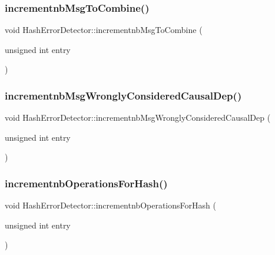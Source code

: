 \subsubsection{\texorpdfstring{incrementnb\+Msg\+To\+Combine()}{incrementnbMsgToCombine()}}
{\footnotesize\ttfamily void Hash\+Error\+Detector\+::incrementnb\+Msg\+To\+Combine (\begin{DoxyParamCaption}\item[{unsigned int}]{entry }\end{DoxyParamCaption})}

\mbox{\label{class_hash_error_detector_a007d537bdfd329c6b23b432b58d4cf4c}} 
\subsubsection{\texorpdfstring{incrementnb\+Msg\+Wrongly\+Considered\+Causal\+Dep()}{incrementnbMsgWronglyConsideredCausalDep()}}
{\footnotesize\ttfamily void Hash\+Error\+Detector\+::incrementnb\+Msg\+Wrongly\+Considered\+Causal\+Dep (\begin{DoxyParamCaption}\item[{unsigned int}]{entry }\end{DoxyParamCaption})}

\mbox{\label{class_hash_error_detector_a6aa56dfbb555e15093bd5d93a683fa42}} 
\subsubsection{\texorpdfstring{incrementnb\+Operations\+For\+Hash()}{incrementnbOperationsForHash()}}
{\footnotesize\ttfamily void Hash\+Error\+Detector\+::incrementnb\+Operations\+For\+Hash (\begin{DoxyParamCaption}\item[{unsigned int}]{entry }\end{DoxyParamCaption})}


